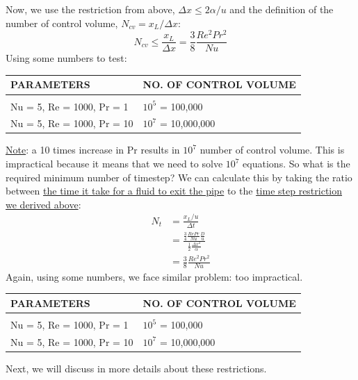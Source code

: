 \documentclass[11pt]{article}
\begin{document}
Now, we use the restriction from above, \(\Delta x \leq 2\alpha / u\) and the definition of the number of control volume, \(N_{cv} = x_L/\Delta x\):
\begin{equation*}
\boxed{N_{cv} \leq \frac{x_L}{\Delta x} = \frac{3}{8}\frac{Re^2Pr^2}{Nu}}
\end{equation*}
Using some numbers to test:
\begin{center}
\begin{tabular}{ll}
\textbf{PARAMETERS} & \textbf{NO. OF CONTROL VOLUME}\\
\hline
 & \\
Nu = 5, Re = 1000, Pr = 1 & \(10^5\) = 100,000\\
Nu = 5, Re = 1000, Pr = 10 & \(10^7\) = 10,000,000\\
\end{tabular}
\end{center}
\uline{Note}: a 10 times increase in Pr results in \(10^7\) number of control volume. This is impractical because it means that we need to solve
\(10^7\) equations. So what is the required minimum number of timestep? We can calculate this by taking the ratio between \uline{the time it take for a fluid
to exit the pipe} to the \uline{time step restriction we derived above}:
\begin{equation*}
\begin{aligned}
N_t &= \frac{x_L/u}{\Delta t}\\
&= \frac{\frac{3}{4}\frac{RePr}{Nu}\frac{D}{u}}{\frac{1}{2}\frac{\Delta x^2}{\alpha}}\\
&= \frac{3}{8}\frac{Re^2Pr^2}{Nu}
\end{aligned}
\end{equation*}
Again, using some numbers, we face similar problem: too impractical. 
\begin{center}
\begin{tabular}{ll}
\textbf{PARAMETERS} & \textbf{NO. OF CONTROL VOLUME}\\
\hline
 & \\
Nu = 5, Re = 1000, Pr = 1 & \(10^5\) = 100,000\\
Nu = 5, Re = 1000, Pr = 10 & \(10^7\) = 10,000,000\\
\end{tabular}
\end{center}
Next, we will discuss in more details about these restrictions. 
\end{document}
